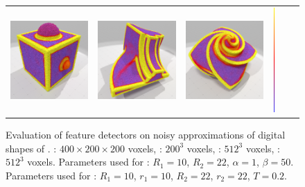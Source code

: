 \begin{figure}[ht]
\begin{center}
\begin{tabular}{l c c c cl}
      \includegraphics[width=4.0cm]{images/Feature/CubeSphere_noise_VCM_r_22} &
      \includegraphics[width=4.0cm]{images/Feature/Fandisk_noise_VCM_r_22} &
      \includegraphics[width=4.0cm]{images/Feature/OctaFlower_512_noise_VCM_r_22} &
      \includegraphics[width=0.1cm,height=4cm]{images/YMTB6W}
    \end{tabular}
    \caption[Evaluation of feature detectors on noisy approximations of digital shapes of ]{Evaluation of feature detectors on noisy approximations of digital shapes of .
    \SpheresUnion : $400 \times 200 \times 200$ voxels, \CubeSphere : $200^3$ voxels, \Fandisk : $512^3$ voxels, \OctaFlower : $512^3$ voxels.
    Parameters used for \cite{Telea2004}: $R_1 = 10$, $R_2 = 22$, $\alpha = 1$, $\beta = 50$.
    Parameters used for \cite{Merigot2011}: $R_1 = 10$, $r_1 = 10$, $R_2 = 22$, $r_2 = 22$, $T = 0.2$.\label{fig:feature-comparative-noise}}
  \end{center}
\end{figure}
